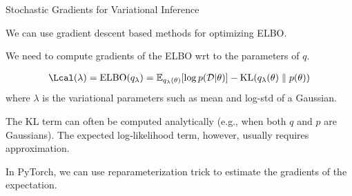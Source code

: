 \documentclass[aspectratio=169,xcolor=dvipsnames,svgnames,x11names,fleqn]{beamer}
\begin{document}
%
%
%
%
%
%
%
%
%

\begin{frame}{Stochastic Gradients for Variational Inference}

We can use gradient descent based methods for optimizing ELBO.


    \begin{tcolorbox}[colback=softblue, colframe=mainblue, arc=4pt, boxrule=1pt, left=10pt, right=10pt, top=8pt, bottom=8pt]
    
We need to compute gradients of the ELBO wrt to the parameters of $q$.

\begin{align*}
\Lcal (\lambda) = \text{ELBO}(q_\lambda) = \mathbb{E}_{q_{\lambda}(\theta)}[ \log p(\mathcal{D}|\theta)] - \text{KL}(q_{\lambda}(\theta) \parallel p(\theta))
\end{align*}
where $\lambda$ is the variational parameters such  as mean and log-std of a Gaussian.
\end{tcolorbox}

The KL term can often be computed analytically (e.g., when both $q$ and $p$ are Gaussians). The expected log‑likelihood term, however, usually requires approximation.


    \begin{tcolorbox}
In PyTorch, we can use reparameterization trick to estimate the gradients of the expectation.
\end{tcolorbox}

\end{frame}
\end{document}
